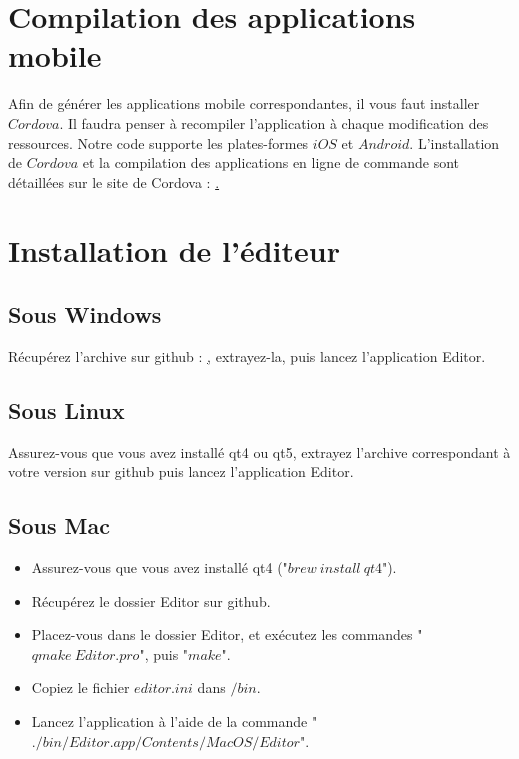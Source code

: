 \documentclass[11pt]{article}
\begin{document}
\section{Compilation des applications mobile}

Afin de générer les applications mobile correspondantes, il vous faut installer $Cordova$. Il faudra penser à recompiler l'application à chaque modification des ressources. Notre code supporte les plates-formes $iOS$ et $Android$. L'installation de $Cordova$ et la compilation des applications en ligne de commande sont détaillées sur le site de Cordova : \href{http://cordova.apache.org/docs/en/3.5.0/guide_cli_index.md.html#The%20Command-Line%20Interface}.

\section{Installation de l'éditeur}
\subsection{Sous Windows}
Récupérez l'archive sur github : \href{https://github.com/ProjetCristallo/Editor/releases}, extrayez-la, puis lancez l'application Editor.
\subsection{Sous Linux}
Assurez-vous que vous avez installé qt4 ou qt5, extrayez l'archive correspondant à votre version sur github puis lancez l'application Editor.
\subsection{Sous Mac}
\begin{itemize}
\item Assurez-vous que vous avez installé qt4 ("$brew\ install\ qt4$").
\item Récupérez le dossier Editor sur github.
\item Placez-vous dans le dossier Editor, et exécutez les commandes "$qmake\ Editor.pro$", puis "$make$".
\item Copiez le fichier $editor.ini$ dans $/bin$.
\item Lancez l'application à l'aide de la commande "$./bin/Editor.app/Contents/MacOS/Editor$".
\end{itemize}
\end{document}
